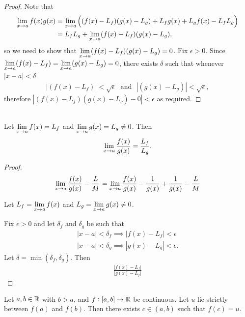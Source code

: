 \begin{proof}
  Note that
  \begin{align*}
    \lim\limits_{x \to a} f(x)g(x) &= \lim\limits_{x \to a} \Big((f(x) - L_f)(g(x) - L_g) + L_fg(x) + L_gf(x) - L_fL_g\Big)\\
                    &= L_fL_g + \lim\limits_{x \to a} (f(x) - L_f)(g(x) - L_g),
  \end{align*}
  so we need to show that $\lim\limits_{x \to a} (f(x) - L_f)(g(x) - L_g) = 0$. Fix $\epsilon > 0$. Since
  $\lim\limits_{x \to a} (f(x) - L_f) = \lim\limits_{x \to a} (g(x) - L_g) = 0$, there exists $\delta$ such that whenever
  $|x - a| < \delta$
  \begin{align*}
    |(f(x) - L_f)| < \sqrt \epsilon ~~~\text{and}~~~|(g(x) - L_g)| < \sqrt \epsilon,
  \end{align*}
  therefore $|(f(x) - L_f)(g(x) - L_g) - 0| < \epsilon$ as required.
\end{proof}

\begin{theorem*}~\\
  Let $\lim\limits_{x \to a} f(x) = L_f$ and $\lim\limits_{x \to a} g(x) = L_g \neq 0$. Then
  \begin{align*}
    \lim\limits_{x \to a} \frac{f(x)}{g(x)} = \frac{L_f}{L_g}.
  \end{align*}
\end{theorem*}

\begin{proof}
  \begin{align*}
    \lim\limits_{x \to a} \frac{f(x)}{g(x)} - \frac{L}{M}
    = \lim\limits_{x \to a} \frac{f(x)}{g(x)} - \frac{1}{g(x)} + \frac{1}{g(x)} - \frac{L}{M}
  \end{align*}

  Let $L_f = \lim\limits_{x \to a} f(x)$ and $L_g = \lim\limits_{x \to a} g(x) \neq 0$.

  Fix $\epsilon > 0$ and let $\delta_f$ and $\delta_g$ be such that
  \begin{align*}
    |x - a| < \delta_f \implies |f(x) - L_f| < \epsilon\\
    |x - a| < \delta_g \implies |g(x) - L_g| < \epsilon.
  \end{align*}
  Let $\delta = \min(\delta_f, \delta_g)$. Then
  \begin{align*}
    \frac{|f(x) - L_f|}{|g(x) - L_f|}
  \end{align*}
\end{proof}


\begin{theorem*}
  Let $a, b \in \mathbb{R}$ with $b > a$, and $f:[a,b] \to \mathbb{R}$ be continuous. Let $u$ lie strictly between
  $f(a)$ and $f(b)$. Then there exists $c \in (a, b)$ such that $f(c) = u$.
\end{theorem*}

